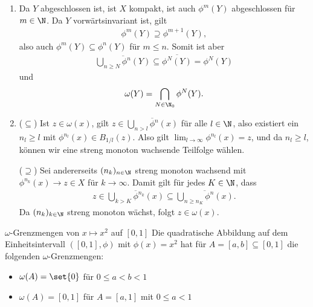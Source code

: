 \begin{beweis}
\renewcommand{\labelenumi}{(\roman{enumi})}
  \begin{enumerate}
  \item Da $Y$ abgeschlossen ist, ist $X$ kompakt, ist auch $\phi^m(Y)$ abgeschlossen für $m \in \N$. Da $Y$ vorwärtsinvariant ist, gilt
    \begin{align*}
      \phi^m(Y) \supseteq \phi^{m+1}(Y),
    \end{align*}
 also auch $\phi^m(Y) \subseteq \phi^n(Y)$ für $m \leq n$. Somit ist aber 
 \begin{align*}
   \overline {\bigcup_{n \geq N} \phi^n(Y)} \subseteq \overline{\phi^N (Y)} = \phi^N (Y)
 \end{align*}
und 
\begin{align*}
  \omega(Y) = \bigcap_{N \in \N_0} \phi^N(Y).
\end{align*}
\item  ($\subseteq$) Ist $z \in \omega(x)$, gilt $z \in \overline{\bigcup_{n >l} \phi^n(x)}$ für alle $l \in \N$, also existiert ein $n_l \geq l$ mit $\phi^{n_l}(x) \in B_{1/l}(z)$. Also gilt $\lim_{l \to \infty} \phi^{n_l}(x) = z$, und da $n_l \geq l$, können wir eine streng monoton wachsende Teilfolge wählen. 

($\supseteq$) Sei andererseits $(n_k)_{n \in \N}$ streng monoton wachsend mit $\phi^{n_k}(x) \to z \in X$ für $k \to \infty$. Damit gilt für jedes $K \in \N$, dass 
\begin{align*}
  z \in \overline{\bigcup_{k > K} \phi^{n_k}(x)} \subseteq \overline{\bigcup_{n \geq n_K} \phi^n (x)}.
\end{align*}
Da $(n_k)_{k \in \N}$ streng monoton wächst, folgt $z \in \omega(x)$.
 \end{enumerate}
\end{beweis}

\begin{beispiel} $\omega$-Grenzmengen von $x \mapsto x^2$ auf $[0,1]$
  Die quadratische Abbildung auf dem Einheitsintervall $([0,1], \phi)$ mit $\phi(x) = x^2$ hat für $A = [a, b] \subseteq [0,1]$ die folgenden $\omega$-Grenzmengen:
  \begin{itemize}
  \item $\omega(A)=\set{0}$ für $0\leq a < b <1$
  \item $\omega(A)=[0,1]$ für $ A = [a, 1]$ mit $0 \leq a  <1$
  \end{itemize}
\end{beispiel}

